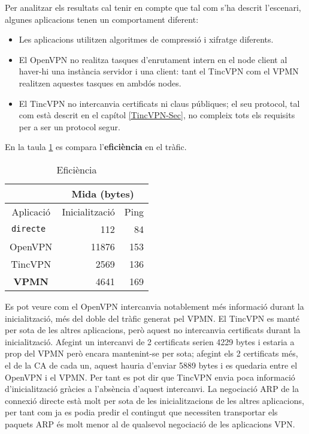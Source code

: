 Per analitzar els resultats cal tenir en compte que tal com s'ha descrit l'escenari, algunes aplicacions tenen un comportament diferent:
\begin{itemize}
\item Les aplicacions utilitzen algoritmes de compressió i xifratge diferents.
\item El OpenVPN no realitza tasques d'enrutament intern en el node client al haver-hi una instància servidor i una client: tant el TincVPN com el VPMN realitzen aquestes tasques en ambdós nodes.
\item El TincVPN no intercanvia certificats ni claus públiques; el seu protocol, tal com està descrit en el capítol \ref{TincVPN-Sec}, no compleix tots els requisits per a ser un protocol segur.
\end{itemize}

En la taula \ref{T:efi} es compara l'\textbf{eficiència} en el tràfic.
\begin{table}[htb]
\begin{center}
\begin{tabular}{|c|r|r|}
\multicolumn{1}{c}{} & \multicolumn{2}{|c|}{Mida (bytes)} \\ \hline
Aplicació & Inicialització & Ping \\ \hline \hline
\tt directe & 112 & 84 \\ \hline
OpenVPN & 11876 & 153 \\ \hline
TincVPN & 2569 & 136 \\ \hline
\bf VPMN & 4641 & 169 \\ \hline
\end{tabular}
\end{center}
\begin{center}
\caption{Eficiència}
\label{T:efi}
\end{center}
\end{table}
Es pot veure com el OpenVPN intercanvia notablement més informació durant la inicialització, més del doble del tràfic generat pel VPMN.
El TincVPN es manté per sota de les altres aplicacions, però aquest no intercanvia certificats durant la inicialització. Afegint un intercanvi de 2 certificats serien 4229 bytes i estaria a prop del VPMN però encara mantenint-se per sota; afegint els 2 certificats més, el de la CA de cada un, aquest hauria d'enviar 5889 bytes i es quedaria entre el OpenVPN i el VPMN. Per tant es pot dir que TincVPN envia poca informació d'inicialització gràcies a l'absència d'aquest intercanvi.
La negociació ARP de la connexió directe està molt per sota de les inicialitzacions de les altres aplicacions, per tant com ja es podia predir el contingut que necessiten transportar els paquets ARP és molt menor al de qualsevol negociació de les aplicacions VPN.

